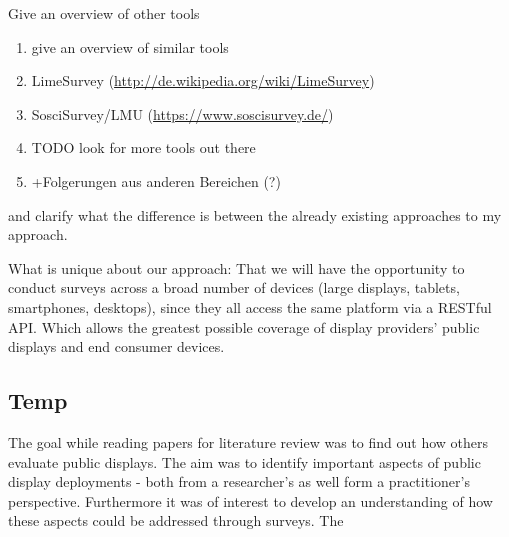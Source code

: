 	Give an overview of other tools 

	\begin{enumerate}
	\item give an overview of similar tools
	\item LimeSurvey (\url{http://de.wikipedia.org/wiki/LimeSurvey})
	\item SosciSurvey/LMU (\url{https://www.soscisurvey.de/})
	\item TODO look for more tools out there
	\item +Folgerungen aus anderen Bereichen (?)
	\end{enumerate}

	and clarify what the difference is between the already existing approaches to my approach.





What is unique about our approach: That we will have the opportunity to conduct surveys across a broad number of devices (large displays, tablets, smartphones, desktops), since they all access the same platform via a RESTful API. Which allows the greatest possible coverage of display providers' public displays and end consumer devices.







\subsection{Temp}

	The goal while reading papers for literature review was to find out how others evaluate public displays. The aim was to identify important aspects of public display deployments - both from a researcher's as well form a practitioner's perspective. Furthermore it was of interest to develop an understanding of how these aspects could be addressed through surveys. The 

